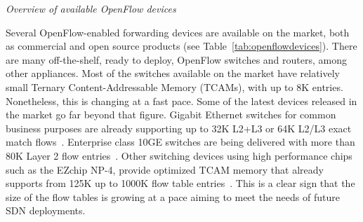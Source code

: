%
%

\vspace{2mm}
\noindent \textit{Overview of available OpenFlow devices}

Several OpenFlow-enabled forwarding devices are available on 
the market, both as commercial and open source products (see Table~\ref{tab:openflowdevices}).
There are many off-the-shelf, ready to deploy, OpenFlow switches and routers, among other appliances.
Most of the switches available on the market have relatively small Ternary Content-Addressable Memory (TCAMs), with up to 8K entries. 
Nonetheless, this is changing at a fast pace. Some of the latest devices released in the market go 
far beyond that figure. Gigabit Ethernet switches for common business purposes are already supporting up 
to 32K L2+L3 or 64K L2/L3 exact match flows~\cite{centecnetworks2013-1}. Enterprise class 10GE switches 
are being delivered with more than 80K Layer 2 flow entries~\cite{nec2013-1}. Other switching 
devices using high performance chips such as the EZchip NP-4, provide optimized TCAM memory that 
already supports from 125K up to 1000K flow table entries~\cite{noviflow2013-1}. This is a clear sign that the size 
of the flow tables is growing at a pace aiming to meet the needs of future SDN deployments.

